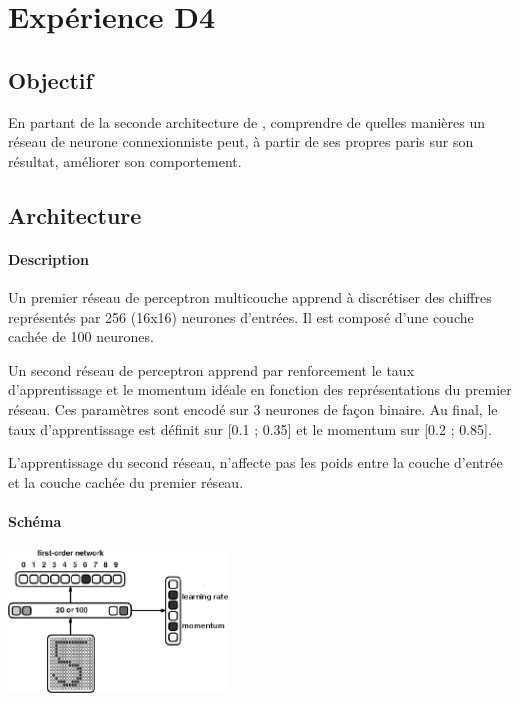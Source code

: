 \section{Expérience D4} \label{expD4}
  \subsection{Objectif}
    En partant de la seconde architecture de \cite{Cleeremans_2007}, 
    comprendre de quelles manières un réseau de neurone connexionniste peut, à partir de ses propres paris
    sur son résultat, améliorer son comportement.
  
  
  \subsection{Architecture}
    \paragraph{Description}
      Un premier réseau de perceptron multicouche apprend à discrétiser des chiffres représentés
      par 256 (16x16) neurones d'entrées. Il est composé d'une couche cachée de 100 neurones.
      
      Un second réseau de perceptron apprend par renforcement le taux d'apprentissage et le
      momentum idéale en fonction des représentations du premier réseau. Ces paramètres sont 
      encodé sur 3 neurones de façon binaire. Au final, le taux d'apprentissage est définit 
      sur [0.1 ; 0.35] et le momentum sur [0.2 ; 0.85].
      
      L'apprentissage du second réseau, n'affecte pas les poids entre la couche d'entrée et la 
      couche cachée du premier réseau.
    \paragraph{Schéma}
      \begin{center}
	\includegraphics[width=220px]{data/expD4/schema.png}
      \end{center}
      
